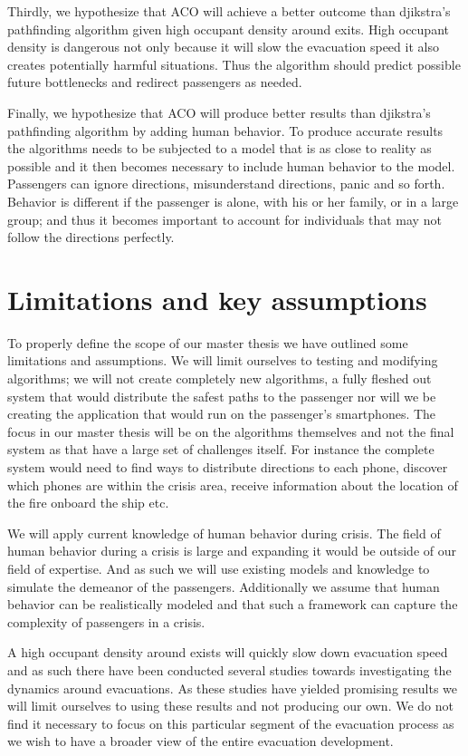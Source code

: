 Thirdly, we hypothesize that ACO will achieve a better outcome than djikstra's pathfinding algorithm
given high occupant density around exits. High occupant density is dangerous not only
because it will slow the evacuation speed it also creates potentially harmful situations. Thus the algorithm
should predict possible future bottlenecks and redirect passengers as needed.

Finally, we hypothesize that ACO will produce better results than djikstra's pathfinding algorithm                 %
by adding human behavior. To produce accurate results the algorithms needs to be subjected
to a model that is as close to reality as possible and it then becomes necessary to include
human behavior to the model. Passengers can ignore directions, misunderstand directions, panic
and so forth. Behavior is different if the passenger is alone, with his or her family, or in a large group;
and thus it becomes important to account for individuals that may not follow the directions perfectly.

\section{Limitations and key assumptions}

To properly define the scope of our master thesis we have outlined
some limitations and assumptions. We will limit ourselves to testing and modifying algorithms;
we will not create completely new algorithms, a fully fleshed out system that would distribute the
safest paths to the passenger nor will we be creating the application that would run on the passenger's smartphones.
The focus in our master thesis will be on the algorithms themselves and not the final system as that have a large set
of challenges itself. For instance the complete system would need to find ways to distribute directions to each phone,
discover which phones are within the crisis area, receive information about the location of the fire onboard the ship etc.

We will apply current knowledge of human behavior during crisis. The field of human behavior during a crisis is large
and expanding it would be outside of our field of expertise. And as such we will use existing models and knowledge
to simulate the demeanor of the passengers. Additionally we assume that human behavior can be realistically modeled
and that such a framework can capture the complexity of passengers in a crisis.

A high occupant density around exists will quickly slow down evacuation speed and as such there have been conducted several studies
towards investigating the dynamics around evacuations. As these studies have yielded promising results we will
limit ourselves to using these results and not producing our own. We do not find it necessary to focus on this particular segment 
of the evacuation process as we wish to have a broader view of the entire evacuation development.

